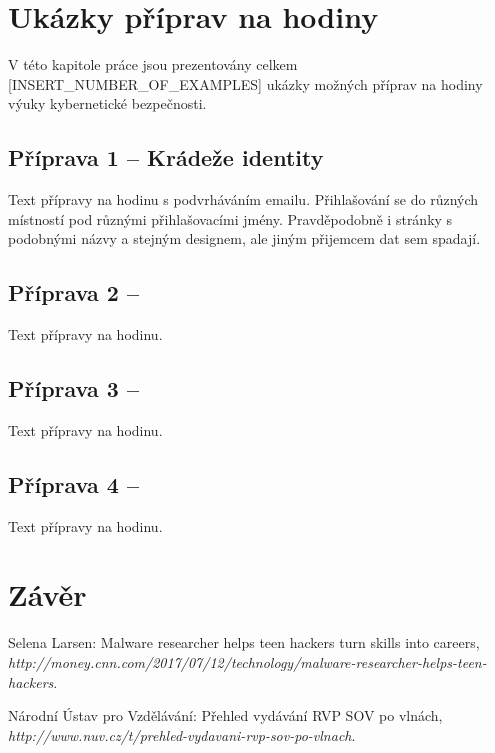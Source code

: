 \documentclass[a4paper, 12pt]{article}
\begin{document}
\newpage
\section{Ukázky příprav na hodiny}
V této kapitole práce jsou prezentovány celkem [INSERT\_NUMBER\_OF\_EXAMPLES] ukázky možných příprav na hodiny výuky kybernetické bezpečnosti.

\subsection{Příprava 1 -- Krádeže identity}
Text přípravy na hodinu s podvrháváním emailu. Přihlašování se do různých místností pod různými přihlašovacími jmény. Pravděpodobně i stránky s podobnými názvy a stejným designem, ale jiným přijemcem dat sem spadají.

\subsection{Příprava 2 -- }
Text přípravy na hodinu.

\subsection{Příprava 3 -- }
Text přípravy na hodinu.

\subsection{Příprava 4 -- }
Text přípravy na hodinu.

\newpage
\section{Závěr}







\newpage
\begin{thebibliography}{9}

    Selena Larsen: Malware researcher helps teen hackers turn skills into careers,
    \\\textit{http://money.cnn.com/2017/07/12/technology/malware-researcher-helps-teen-hackers}.

    Národní Ústav pro Vzdělávání: Přehled vydávání RVP SOV po vlnách,
    \\\textit{http://www.nuv.cz/t/prehled-vydavani-rvp-sov-po-vlnach}.

\end{thebibliography}
\end{document}
